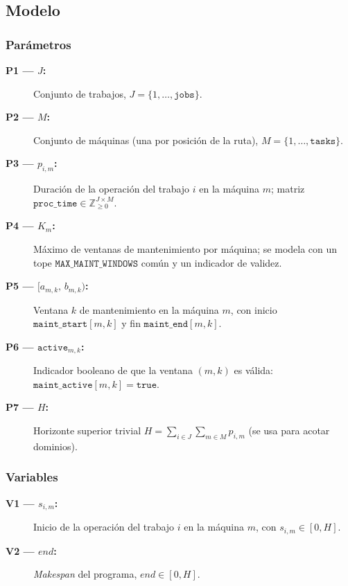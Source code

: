 
\subsection{Modelo}\label{sec:01-jobshop_mantenimiento-modelo}

\subsubsection*{Parámetros}
\begin{description}
  \item[\textbf{P1 — \(J\):}] Conjunto de trabajos, \(J=\{1,\dots,\texttt{jobs}\}\).
  \item[\textbf{P2 — \(M\):}] Conjunto de máquinas (una por posición de la ruta), \(M=\{1,\dots,\texttt{tasks}\}\).
  \item[\textbf{P3 — \(p_{i,m}\):}] Duración de la operación del trabajo \(i\) en la máquina \(m\); matriz \(\texttt{proc\_time}\in\mathbb{Z}_{\ge 0}^{J\times M}\).
  \item[\textbf{P4 — \(K_m\):}] Máximo de ventanas de mantenimiento por máquina; se modela con un tope \(\texttt{MAX\_MAINT\_WINDOWS}\) común y un indicador de validez.
  \item[\textbf{P5 — \([a_{m,k},\,b_{m,k})\):}] Ventana \(k\) de mantenimiento en la máquina \(m\), con inicio \(\texttt{maint\_start}[m,k]\) y fin \(\texttt{maint\_end}[m,k]\).
  \item[\textbf{P6 — \(\texttt{active}_{m,k}\):}] Indicador booleano de que la ventana \((m,k)\) es válida: \(\texttt{maint\_active}[m,k]=\texttt{true}\).
  \item[\textbf{P7 — \(H\):}] Horizonte superior trivial \(H=\sum_{i\in J}\sum_{m\in M} p_{i,m}\) (se usa para acotar dominios).
\end{description}

\subsubsection*{Variables}
\begin{description}
  \item[\textbf{V1 — \(s_{i,m}\):}] Inicio de la operación del trabajo \(i\) en la máquina \(m\), con \(s_{i,m}\in[0,H]\).
  \item[\textbf{V2 — \(\textit{end}\):}] \emph{Makespan} del programa, \(\textit{end}\in[0,H]\).
\end{description}

